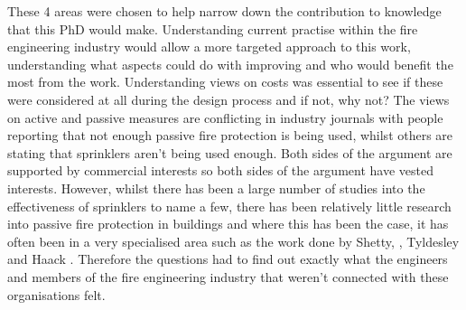 \documentclass[table,a4paper,oneside]{book}
\begin{document}
These 4 areas were chosen to help narrow down the contribution to knowledge that this PhD would make. Understanding current practise within the fire engineering industry would allow a more targeted approach to this work, understanding what aspects could do with improving and who would benefit the most from the work. Understanding views on costs was essential to see if these were considered at all during the design process and if not, why not? The views on active and passive measures are conflicting in industry journals \citep{Mountford2003,Rowan2010} with people reporting that not enough passive fire protection is being used, whilst others are stating that sprinklers aren't being used enough. Both sides of the argument are supported by commercial interests so both sides of the argument have vested interests. However, whilst there has been a large number of studies into the effectiveness of sprinklers \citep{Melinek1993299,Melinek1993,Poh2005,Bennetts2008,Butry2009} to name a few, there has been relatively little research into passive fire protection in buildings \citep{Baldwin1974,Cozzani2007209} and where this has been the case, it has often been in a very specialised area such as the work done by Shetty, \citep{Shetty1998139}, Tyldesley \citep{Tyldesley2004331} and Haack \citep{Haack2004}. Therefore the questions had to find out exactly what the engineers and members of the fire engineering industry that weren't connected with these organisations felt.
\end{document}
